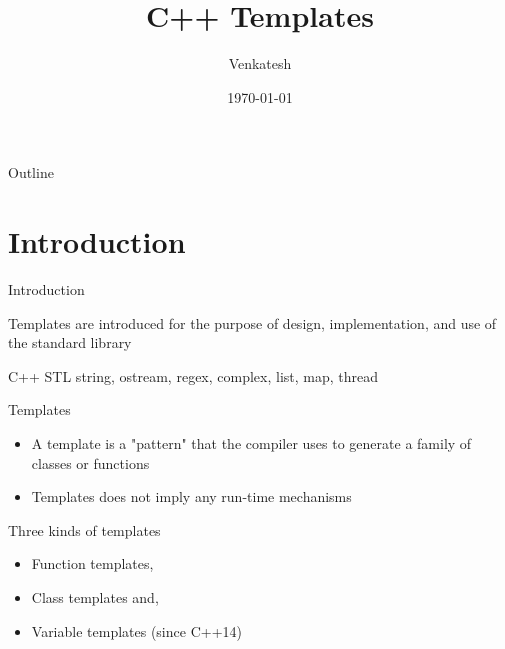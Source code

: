 \documentclass{beamer}
\title{C++ Templates} %
\author{Venkatesh} %
\institute{WDC}
\date{\today} %
\begin{document}
\lstset{breakatwhitespace=true,
language=C++,
columns=fullflexible,
keepspaces=true,
breaklines=true,
tabsize=3, 
showstringspaces=false,
extendedchars=true
inputencoding=utf8}


\begin{frame}
\titlepage %
\end{frame}

\begin{frame}{Outline}
  \tableofcontents
\end{frame}



\section{Introduction}
\begin{frame}{Introduction}

Templates are introduced for the purpose of design,
implementation, and use of the standard library

\begin{block}{C++ STL}
string, ostream, regex, complex, list, map, thread
\end{block}
\end{frame}

\begin{frame}{Templates}

\begin{itemize}
\item A template is a "pattern" that the compiler uses to generate a family of classes or functions
\item Templates does not imply any run-time mechanisms
\end{itemize}

\begin{block}{Three kinds of templates}
\begin{itemize}
\item Function templates,
\item Class templates and,
\item Variable templates (since C++14)
\end{itemize}
\end{block}
\end{frame}
\end{document}
